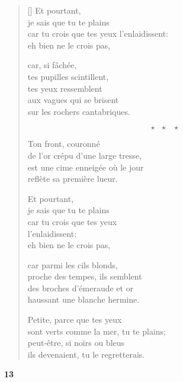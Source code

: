 \documentclass[a4paper,12pt]{book}
\begin{document}
\begin{verse}[\versewidth]
  Et pourtant, \\
  je sais que tu te plains \\
  car tu crois que tes yeux
  l'enlaidissent: \\
  eh bien ne le crois pas,

  car, si fâchée, \\
  tes pupilles scintillent, \\
  tes yeux ressemblent \\
  aux vagues qui se brisent \\
  sur les rochers cantabriques.

  $$\star \ \ \ \star \ \ \ \star$$

  Ton front, couronné \\
  de l'or crépu d'une large tresse, \\
  est une cime enneigée où le jour \\
  reflète sa première lueur.

  Et pourtant, \\
  je sais que tu te plains \\
  car tu crois que tes yeux \\
  l'enlaidissent: \\
  eh bien ne le crois pas,

  car parmi les cils blonds, \\
  proche des tempes, ils semblent \\
  des broches d'émeraude et or \\
  haussant une blanche hermine.

  Petite, parce que tes yeux \\
  sont verts comme la mer, tu te plains; \\
  peut-être, si noirs ou bleus \\
  ils devenaient, tu le regretterais.
\end{verse}

\bigskip

\begin{center}
  \textbf{13}
\end{center}

\settowidth{\versewidth}{comme un point de lumière irradie une idée,}
\end{document}
